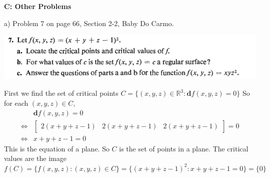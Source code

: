 \documentclass[10pt,letterpaper]{hmcpset}
\begin{document}
\newpage
\textbf{C: Other Problems}\\
\begin{problem}
a) Problem 7 on page 66, Section 2-2, Baby Do Carmo.

\includegraphics[scale=0.7]{Ca.png}
\end{problem}
\begin{solution}
  First we find the set of critical points $C = \{ (x, y, z) \in \mathbb{R}^3 :
  \mathbf{d}f(x, y, z) = 0\}$ 
  So for each $(x, y, z) \in C$,
  \begin{align*}
    &\mathbf{d}f(x, y, z) = 0 \\
    \iff &\begin{bmatrix}2(x + y + z - 1) & 2(x + y + z - 1) & 2(x + y + z - 1)\end{bmatrix} = 0 \\
    \iff &x + y + z - 1 = 0 
  \end{align*}
  This is the equation of a plane. So $C$ is the set of points in a plane. The
  critical values are the image $f(C) = \{ f(x, y, z): (x, y, z) \in C \} = \{ (x + y + z - 1)^2 : x + y + z - 1 = 0 \}
  = \{ 0 \}$
\end{solution}
\end{document}

